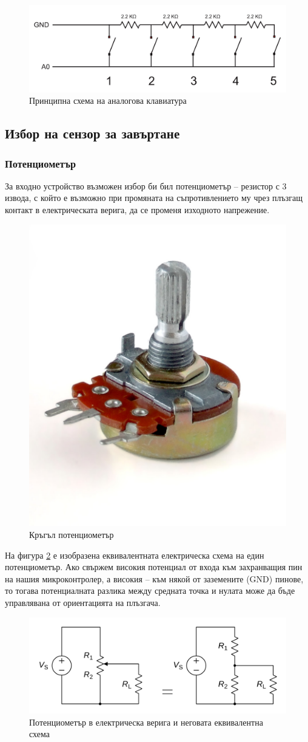 \documentclass[titlepage, oneside, 14pt]{extbook}
\begin{document}
\begin{figure}[!htbp]
    \centering
    \includegraphics[width=0.5\linewidth]{img/keypad_circuit.png}
    \caption{Принципна схема на аналогова клавиатура}
    \label{keypad_circuit}
\end{figure}

\subsection{Избор на сензор за завъртане}

\subsubsection{Потенциометър}

За входно устройство възможен избор би бил потенциометър \cite{potent} --
резистор с 3 извода, с който е възможно при промяната на съпротивлението му
чрез плъзгащ контакт в електрическата верига, да се променя изходното напрежение.

\begin{figure}[!htbp]
    \centering
    \includegraphics[width=0.3\linewidth]{img/potentiometer.png}
    \caption{Кръгъл потенциометър}
\end{figure}

На фигура \ref{potentiometer_circuit} е изобразена еквивалентната електрическа схема на един потенциометър.
Ако свържем високия потенциал от входа към захранващия пин на нашия микроконтролер,
а високия -- към някой от заземените (GND) пинове, то тогава потенциалната разлика между
средната точка и нулата може да бъде управлявана от ориентацията на плъзгача.

\begin{figure}[!htbp]
    \centering
    \includegraphics[width=0.7\linewidth]{img/potentiometer_circuit.png}
    \caption{Потенциометър в електрическа верига и неговата еквивалентна схема}
    \label{potentiometer_circuit}
\end{figure}
\end{document}
